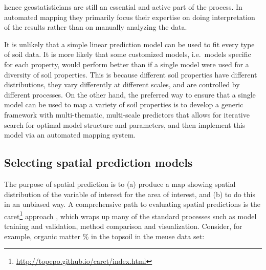 \documentclass[11pt]{krantz}
\newenvironment{Shaded}{\begin{snugshade}}{\end{snugshade}}
\newcommand{\CommentTok}[1]{\textcolor[rgb]{0.37,0.37,0.37}{\textit{#1}}}
\newcommand{\DataTypeTok}[1]{\textcolor[rgb]{0.27,0.27,0.27}{#1}}
\newcommand{\DecValTok}[1]{\textcolor[rgb]{0.06,0.06,0.06}{#1}}
\newcommand{\KeywordTok}[1]{\textcolor[rgb]{0.27,0.27,0.27}{\textbf{#1}}}
\newcommand{\NormalTok}[1]{#1}
\newcommand{\OperatorTok}[1]{\textcolor[rgb]{0.43,0.43,0.43}{\textbf{#1}}}
\newcommand{\OtherTok}[1]{\textcolor[rgb]{0.37,0.37,0.37}{#1}}
\newcommand{\StringTok}[1]{\textcolor[rgb]{0.5,0.5,0.5}{#1}}
\renewcommand{\href}[2]{#2\footnote{\url{#1}}}
\theoremstyle{definition}
\theoremstyle{definition}
\theoremstyle{definition}
\theoremstyle{remark}
\begin{document}
hence geostatisticians are still an essential and active part of the
process. In automated mapping they primarily focus their expertise on
doing interpretation of the results rather than on manually analyzing
the data.

It is unlikely that a simple linear prediction model can be used to fit
every type of soil data. It is more likely that some customized models,
i.e.~models specific for each property, would perform better than if a
single model were used for a diversity of soil properties. This is
because different soil properties have different distributions, they
vary differently at different scales, and are controlled by different
processes. On the other hand, the preferred way to ensure that a single
model can be used to map a variety of soil properties is to develop a
generic framework with multi-thematic, multi-scale predictors that
allows for iterative search for optimal model structure and parameters,
and then implement this model via an automated mapping system.

\hypertarget{selecting-spatial-prediction-models}{%
\subsection{Selecting spatial prediction
models}\label{selecting-spatial-prediction-models}}

The purpose of spatial prediction is to (a) produce a map showing
spatial distribution of the variable of interest for the area of
interest, and (b) to do this in an unbiased way. A comprehensive path to
evaluating spatial predictions is the
\href{http://topepo.github.io/caret/index.html}{caret} approach
\citep{kuhn2013applied}, which wraps up many of the standard processes
such as model training and validation, method comparison and
visualization. Consider, for example, organic matter \% in the topsoil
in the meuse data set:

\begin{Shaded}
\end{Shaded}
\end{document}
